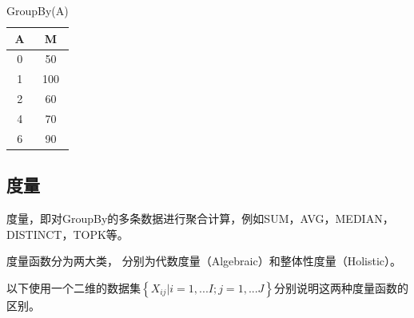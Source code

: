 \begin{table}[!ht]
\begin{center}
\begin{tabular}{|c|c|}
\hline 
A & M \\ 
\hline 
0 & 50 \\ 
\hline 
1 & 100 \\ 
\hline 
2 & 60 \\ 
\hline 
4 & 70 \\ 
\hline 
6 & 90 \\ 
\hline 
\end{tabular} 
\end{center}
\caption{GroupBy(A)}\label{groupby_a_table}
\end{table}




\subsection{度量}

度量，即对GroupBy的多条数据进行聚合计算，例如SUM，AVG，MEDIAN，DISTINCT，TOPK等。

度量函数分为两大类， 分别为代数度量（Algebraic）和整体性度量（Holistic）。

以下使用一个二维的数据集$\left\{ {X}_{ij}|i=1,...I; j=1,...J \right\}$分别说明这两种度量函数的区别。


